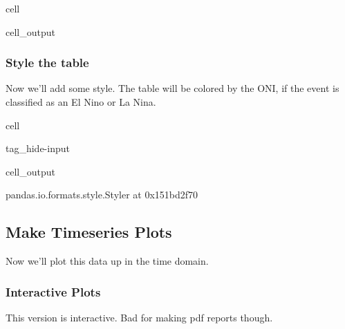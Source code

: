 \documentclass[letterpaper,10pt,english]{jupyterBook}
\begin{document}
\begin{sphinxuseclass}{cell}
\begin{sphinxVerbatimOutput}
\begin{sphinxuseclass}{cell_output}
\end{sphinxuseclass}\end{sphinxVerbatimOutput}

\end{sphinxuseclass}

\subsubsection{Style the table}
\label{\detokenize{notebooks/regional_and_local/SL_Rankings_annual:style-the-table}}\label{\detokenize{notebooks/regional_and_local/SL_Rankings_annual:sl-rankings-results}}
\sphinxAtStartPar
Now we’ll add some style. The table will be colored by the ONI, if the event is classified as an El Nino or La Nina.

\begin{sphinxuseclass}{cell}
\begin{sphinxuseclass}{tag_hide-input}\begin{sphinxVerbatimOutput}

\begin{sphinxuseclass}{cell_output}
\begin{sphinxVerbatim}[commandchars=\\\{\}]
\PYGZlt{}pandas.io.formats.style.Styler at 0x151bd2f70\PYGZgt{}
\end{sphinxVerbatim}

\end{sphinxuseclass}\end{sphinxVerbatimOutput}

\end{sphinxuseclass}
\end{sphinxuseclass}

\subsection{Make Timeseries Plots}
\label{\detokenize{notebooks/regional_and_local/SL_Rankings_annual:make-timeseries-plots}}\label{\detokenize{notebooks/regional_and_local/SL_Rankings_annual:sl-rankings-timeseries}}
\sphinxAtStartPar
Now we’ll plot this data up in the time domain.


\subsubsection{Interactive Plots}
\label{\detokenize{notebooks/regional_and_local/SL_Rankings_annual:interactive-plots}}
\sphinxAtStartPar
This version is interactive. Bad for making pdf reports though.
\end{document}
